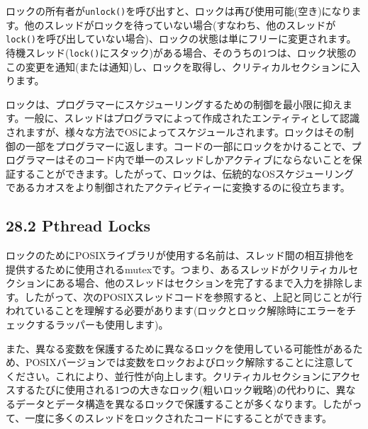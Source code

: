 ロックの所有者が\texttt{unlock()}を呼び出すと、ロックは再び使用可能(空き)になります。他のスレッドがロックを待っていない場合(すなわち、他のスレッドが\texttt{lock()}を呼び出していない場合)、ロックの状態は単にフリーに変更されます。待機スレッド(\texttt{lock()}にスタック)がある場合、そのうちの1つは、ロック状態のこの変更を通知(または通知)し、ロックを取得し、クリティカルセクションに入ります。

ロックは、プログラマーにスケジューリングするための制御を最小限に抑えます。一般に、スレッドはプログラマによって作成されたエンティティとして認識されますが、様々な方法でOSによってスケジュールされます。ロックはその制御の一部をプログラマーに返します。コードの一部にロックをかけることで、プログラマーはそのコード内で単一のスレッドしかアクティブにならないことを保証することができます。したがって、ロックは、伝統的なOSスケジューリングであるカオスをより制御されたアクティビティーに変換するのに役立ちます。

\hypertarget{pthread-locks}{%
\subsection*{28.2 Pthread Locks}\label{pthread-locks}}

ロックのためにPOSIXライブラリが使用する名前は、スレッド間の相互排他を提供するために使用されるmutexです。つまり、あるスレッドがクリティカルセクションにある場合、他のスレッドはセクションを完了するまで入力を排除します。したがって、次のPOSIXスレッドコードを参照すると、上記と同じことが行われていることを理解する必要があります(ロックとロック解除時にエラーをチェックするラッパーも使用します)。

\begin{Shaded}
\begin{Highlighting}[]
\NormalTok{;}
\end{Highlighting}
\end{Shaded}

また、異なる変数を保護するために異なるロックを使用している可能性があるため、POSIXバージョンでは変数をロックおよびロック解除することに注意してください。これにより、並行性が向上します。クリティカルセクションにアクセスするたびに使用される1つの大きなロック(粗いロック戦略)の代わりに、異なるデータとデータ構造を異なるロックで保護することが多くなります。したがって、一度に多くのスレッドをロックされたコードにすることができます。

